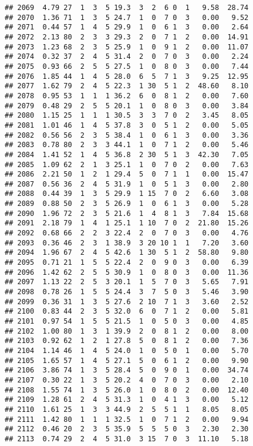 \documentclass[
]{article}
\begin{document}
\begin{verbatim}
## 2069  4.79 27  1  3  5 19.3  3  2  6 0  1   9.58  28.74
## 2070  1.36 71  1  3  5 24.7  1  0  7 0  3   0.00   9.52
## 2071  0.44 57  1  4  5 29.9  1  0  6 1  3   0.00   2.64
## 2072  2.13 80  2  3  3 29.3  2  0  7 1  2   0.00  14.91
## 2073  1.23 68  2  3  5 25.9  1  0  9 1  2   0.00  11.07
## 2074  0.32 37  2  4  5 31.4  2  0  7 0  3   0.00   2.24
## 2075  0.93 66  2  5  5 27.5  1  0  8 0  3   0.00   7.44
## 2076  1.85 44  1  4  5 28.0  6  5  7 1  3   9.25  12.95
## 2077  1.62 79  2  4  5 22.3  1 30  5 1  2  48.60   8.10
## 2078  0.95 53  1  1  1 36.2  6  0  8 1  2   0.00   7.60
## 2079  0.48 29  2  5  5 20.1  1  0  8 0  3   0.00   3.84
## 2080  1.15 25  1  1  1 30.5  3  3  7 0  2   3.45   8.05
## 2081  1.01 46  1  4  5 37.8  3  0  5 1  2   0.00   5.05
## 2082  0.56 56  2  3  5 38.4  1  0  6 1  3   0.00   3.36
## 2083  0.78 80  2  3  3 44.1  1  0  7 1  2   0.00   5.46
## 2084  1.41 52  1  4  5 36.8  2 30  5 1  3  42.30   7.05
## 2085  1.09 62  2  1  3 25.1  1  0  7 0  2   0.00   7.63
## 2086  2.21 50  1  2  1 29.4  5  0  7 1  1   0.00  15.47
## 2087  0.56 36  2  4  5 31.9  1  0  5 1  3   0.00   2.80
## 2088  0.44 39  1  3  5 29.9  1 15  7 0  2   6.60   3.08
## 2089  0.88 50  2  3  5 26.9  1  0  6 1  3   0.00   5.28
## 2090  1.96 72  2  3  5 21.6  1  4  8 1  3   7.84  15.68
## 2091  2.18 79  1  4  1 25.1  1 10  7 0  2  21.80  15.26
## 2092  0.68 66  2  2  3 22.4  2  0  7 0  3   0.00   4.76
## 2093  0.36 46  2  3  1 38.9  3 20 10 1  1   7.20   3.60
## 2094  1.96 67  2  4  5 42.6  1 30  5 1  2  58.80   9.80
## 2095  0.71 21  1  5  5 22.4  2  0  9 0  3   0.00   6.39
## 2096  1.42 62  2  5  5 30.9  1  0  8 0  3   0.00  11.36
## 2097  1.13 22  2  5  3 20.1  1  5  7 0  3   5.65   7.91
## 2098  0.78 26  1  5  5 24.4  3  7  5 0  3   5.46   3.90
## 2099  0.36 31  1  3  5 27.6  2 10  7 1  3   3.60   2.52
## 2100  0.83 44  2  3  5 32.0  6  0  7 1  2   0.00   5.81
## 2101  0.97 54  1  5  5 21.5  1  0  5 0  3   0.00   4.85
## 2102  1.00 80  1  3  1 39.9  2  0  8 1  2   0.00   8.00
## 2103  0.92 62  1  2  1 27.8  5  0  8 1  2   0.00   7.36
## 2104  1.14 46  1  4  5 24.0  1  0  5 0  1   0.00   5.70
## 2105  1.65 57  1  4  5 27.1  5  0  6 1  2   0.00   9.90
## 2106  3.86 74  1  3  5 28.4  5  0  9 0  1   0.00  34.74
## 2107  0.30 22  1  3  5 20.2  4  0  7 0  3   0.00   2.10
## 2108  1.55 74  1  3  5 26.0  1  0  8 0  2   0.00  12.40
## 2109  1.28 61  2  4  5 31.3  1  0  4 1  3   0.00   5.12
## 2110  1.61 25  1  3  3 44.9  2  5  5 1  1   8.05   8.05
## 2111  1.42 80  1  1  1 32.5  1  0  7 1  2   0.00   9.94
## 2112  0.46 20  2  3  5 35.9  5  5  5 0  3   2.30   2.30
## 2113  0.74 29  2  4  5 31.0  3 15  7 0  3  11.10   5.18

\end{verbatim}
\end{document}
